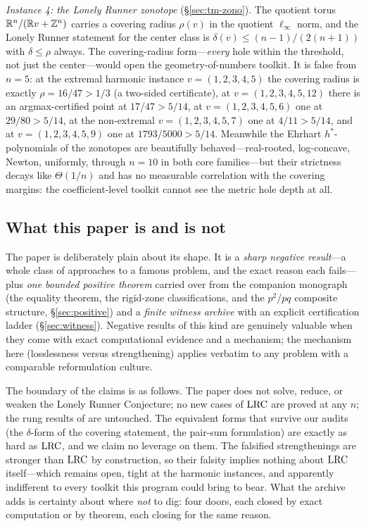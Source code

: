 \emph{Instance 4: the Lonely Runner zonotope}
(\S\ref{sec:tm-zono}). The quotient torus $\mathbb{R}^n/(\mathbb{R} v+\mathbb{Z}^n)$ carries a
covering radius $\rho(v)$ in the quotient $\ell_\infty$ norm, and the
Lonely Runner statement for the center class is
$\delta(v)\le (n{-}1)/(2(n{+}1))$ with $\delta\le\rho$ always. The
covering-radius form---\emph{every} hole within the threshold, not just
the center---would open the geometry-of-numbers toolkit. It is false from
$n=5$: at the extremal harmonic instance $v=(1,2,3,4,5)$ the covering
radius is exactly $\rho=16/47>1/3$ (a two-sided certificate), at
$v=(1,2,3,4,5,12)$ there is an argmax-certified point at $17/47>5/14$,
at $v=(1,2,3,4,5,6)$ one at
$29/80>5/14$, at the non-extremal $v=(1,2,3,4,5,7)$ one at
$4/11>5/14$, and at $v=(1,2,3,4,5,9)$ one at $1793/5000>5/14$. Meanwhile the Ehrhart $h^*$-polynomials of the zonotopes
are beautifully behaved---real-rooted, log-concave, Newton, uniformly,
through $n=10$ in both core families---but their strictness decays like
$\Theta(1/n)$ and has no measurable correlation with the covering
margins: the coefficient-level toolkit cannot see the metric hole depth
at all.

\subsection{What this paper is and is not}

The paper is deliberately plain about its shape. It is a \emph{sharp
negative result}---a whole class of approaches to a famous problem, and
the exact reason each fails---plus \emph{one bounded positive theorem}
carried over from the companion monograph (the equality theorem, the
rigid-zone classifications, and the $p^2$/$pq$ composite structure,
\S\ref{sec:positive}) and a \emph{finite witness archive} with an explicit
certification ladder (\S\ref{sec:witness}). Negative results of this kind
are genuinely valuable when they come with exact computational evidence
and a mechanism; the mechanism here (losslessness versus strengthening)
applies verbatim to any problem with a comparable reformulation culture.

The boundary of the claims is as follows. The paper does not solve,
reduce, or weaken the Lonely Runner Conjecture; no new cases of $\mathrm{LRC}$
are proved at any $n$; the rung results of
\cite{Rosenfeld8,Trakulthongchai,Sungkawichai,Allikvere} are untouched.
The equivalent forms that survive our audits (the $\delta$-form of the
covering statement, the pair-sum formulation) are exactly as hard as
$\mathrm{LRC}$, and we claim no leverage on them. The falsified strengthenings
are stronger than $\mathrm{LRC}$ by construction, so their falsity implies
nothing about $\mathrm{LRC}$ itself---which remains open, tight at the harmonic
instances, and apparently indifferent to every toolkit this program could
bring to bear. What the archive adds is certainty about where \emph{not}
to dig: four doors, each closed by exact computation or by theorem, each
closing for the same reason.

